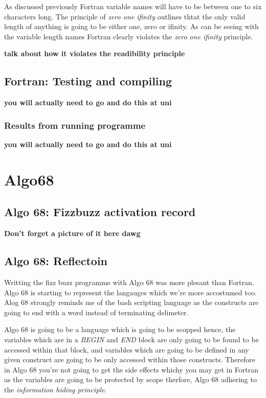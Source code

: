 \documentclass[
	12pt, %
]{fphw}
\begin{document}
As discussed previously Fortran variable names will have to be between one to
six characters long. The principle of \emph{zero one ifinity} outlines thtat the
only valid length of anything is going to be either one, zero or ifinity. As can
be seeing with the variable length names Fortran clearly violates the
\emph{zero one ifinity} principle.

\textbf{talk about how it violates the readibility principle}

\subsection{Fortran: Testing and compiling}
\textbf{you will actually need to go and do this at uni}

\subsubsection{Results from running programme}
\textbf{you will actually need to go and do this at uni}

\section{Algo68}

\subsection{Algo 68: Fizzbuzz activation record}
\textbf{Don't forget a picture of it here dawg}

\subsection{Algo 68: Reflectoin}
Writting the fizz buzz programme with Algo 68 was more plesant than Fortran. Algo
68 is starting to represent the langauges which we're more accostumed too. Alog 68
strongly reminds me of the bash scripting language as the constructs are going
to end with a word instead of terminating delimeter. \par

Algo 68 is going to be a language which is going to be scopped hence, the
variables which are in a \emph{BEGIN} and \emph{END} block are only going to be
found to be accessed within that block, and variables which are going to be defined
in any given construct are going to be only accessed within those constructs.
Therefore in Algo 68 you're not going to get the side effects whichy you may get in
Fortran as the variables are going to be protected by scope therfore, Algo 68
adhering to the \emph{information hiding principle}. \par
\end{document}
